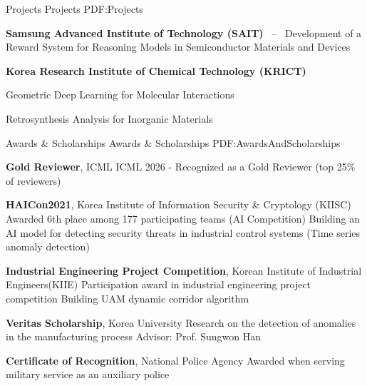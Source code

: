 \documentclass[letterpaper,MMMyyyy,nonstopmode]{simpleresumecv}
\begin{document}
\begin{Body}
\endgroup

\Section
{Projects}
{Projects}
{PDF:Projects}

\textbf{Samsung Advanced Institute of Technology (SAIT)}
\hfill
\mbox{ -- }
\BulletItem
Development of a Reward System for Reasoning Models in Semiconductor Materials and Devices

\textbf{Korea Research Institute of Chemical Technology (KRICT)}

\BulletItem
Geometric Deep Learning for Molecular Interactions
\hfill 
{}   


\BulletItem
Retrosynthesis Analysis for Inorganic Materials
\hfill
{}



\Section
{Awards \&\newline
Scholarships}
{Awards \& Scholarships}
{PDF:AwardsAndScholarships}



\textbf{Gold Reviewer}, ICML
\hfill
{}
\BulletItem
ICML 2026 - Recognized as a Gold Reviewer (top 25\% of reviewers)


\textbf{HAICon2021}, Korea Institute of Information Security \& Cryptology (KIISC)
\hfill
{}
\BulletItem
Awarded 6th place among 177 participating teams (AI Competition)
\BulletItem
Building an AI model for detecting security threats in industrial control systems (Time series anomaly detection)

\textbf{Industrial Engineering Project Competition}, Korean Institute of Industrial Engineers(KIIE)
\hfill
{}
\BulletItem
Participation award in industrial engineering project competition
\BulletItem
Building UAM dynamic corridor algorithm

\textbf{Veritas Scholarship}, Korea University
\hfill
{}
\BulletItem
Research on the detection of anomalies in the manufacturing process
\SubBulletItem
Advisor: Prof. Sungwon Han

\textbf{Certificate of Recognition}, National Police Agency
\hfill
{}
\BulletItem
Awarded when serving military service as an auxiliary police


\end{Body}
\end{document}
